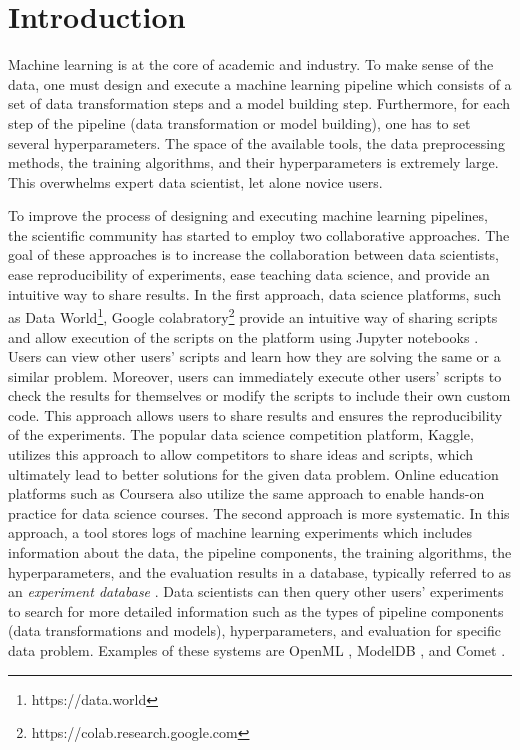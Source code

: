 \section{Introduction} \label{sec-introduction}
Machine learning is at the core of academic and industry.
To make sense of the data, one must design and execute a machine learning pipeline which consists of a set of data transformation steps and a model building step.
Furthermore, for each step of the pipeline (data transformation or model building), one has to set several hyperparameters.
The space of the available tools, the data preprocessing methods, the training algorithms, and their hyperparameters is extremely large.
This overwhelms expert data scientist, let alone novice users.

To improve the process of designing and executing machine learning pipelines, the scientific community has started to employ two collaborative approaches.
The goal of these approaches is to increase the collaboration between data scientists, ease reproducibility of experiments, ease teaching data science, and provide an intuitive way to share results.
In the first approach, data science platforms, such as Data World\footnote{https://data.world}, Google colabratory\footnote{https://colab.research.google.com} provide an intuitive way of sharing scripts and allow execution of the scripts on the platform using Jupyter notebooks \cite{Kluyver:2016aa}. 
Users can view other users' scripts and learn how they are solving the same or a similar problem.
Moreover, users can immediately execute other users' scripts to check the results for themselves or modify the scripts to include their own custom code.
This approach allows users to share results and ensures the reproducibility of the experiments.
The popular data science competition platform, Kaggle, utilizes this approach to allow competitors to share ideas and scripts, which ultimately lead to better solutions for the given data problem.
Online education platforms such as Coursera also utilize the same approach to enable hands-on practice for data science courses.
The second approach is more systematic.
In this approach, a tool stores logs of machine learning experiments which includes information about the data, the pipeline components, the training algorithms, the hyperparameters, and the evaluation results in a database, typically referred to as an \textit{experiment database} \cite{Vanschoren2012}.
Data scientists can then query other users' experiments to search for more detailed information such as the types of pipeline components (data transformations and models), hyperparameters, and evaluation for specific data problem.
Examples of these systems are OpenML \cite{vanschoren2014openml}, ModelDB \cite{vartak2016m}, and Comet \cite{cometml}.


